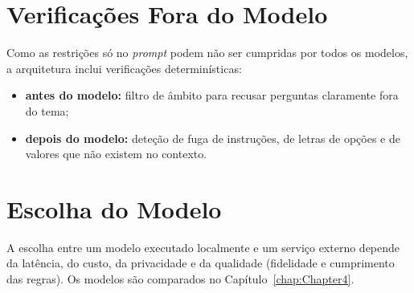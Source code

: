\section{Verificações Fora do Modelo}
\label{sec:chap3_guards}

Como as restrições só no \emph{prompt} podem não ser cumpridas por todos os modelos, a arquitetura inclui verificações determinísticas:
\begin{itemize}
    \item \textbf{antes do modelo:} filtro de âmbito para recusar perguntas claramente fora do tema;
    \item \textbf{depois do modelo:} deteção de fuga de instruções, de letras de opções e de valores que não existem no contexto.
\end{itemize}

\section{Escolha do Modelo}
\label{sec:chap3_model}

A escolha entre um modelo executado localmente e um serviço externo depende da latência, do custo, da privacidade e da qualidade (fidelidade e cumprimento das regras). Os modelos são comparados no Capítulo~\ref{chap:Chapter4}.
